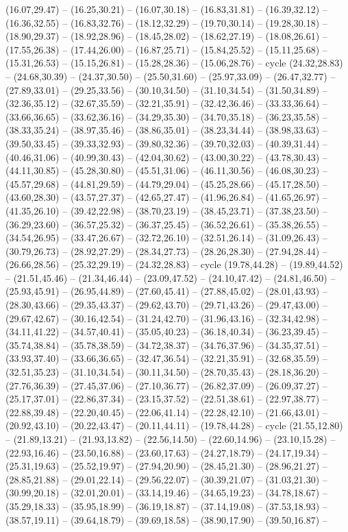 {(16.07,29.47) -- (16.25,30.21) -- (16.07,30.18) -- (16.83,31.81) -- (16.39,32.12) -- (16.36,32.55) -- (16.83,32.76) -- (18.12,32.29) -- (19.70,30.14) -- (19.28,30.18) -- (18.90,29.37) -- (18.92,28.96) -- (18.45,28.02) -- (18.62,27.19) -- (18.08,26.61) -- (17.55,26.38) -- (17.44,26.00) -- (16.87,25.71) -- (15.84,25.52) -- (15.11,25.68) -- (15.31,26.53) -- (15.15,26.81) -- (15.28,28.36) -- (15.06,28.76) -- cycle (24.32,28.83) -- (24.68,30.39) -- (24.37,30.50) -- (25.50,31.60) -- (25.97,33.09) -- (26.47,32.77) -- (27.89,33.01) -- (29.25,33.56) -- (30.10,34.50) -- (31.10,34.54) -- (31.50,34.89) -- (32.36,35.12) -- (32.67,35.59) -- (32.21,35.91) -- (32.42,36.46) -- (33.33,36.64) -- (33.66,36.65) -- (33.62,36.16) -- (34.29,35.30) -- (34.70,35.18) -- (36.23,35.58) -- (38.33,35.24) -- (38.97,35.46) -- (38.86,35.01) -- (38.23,34.44) -- (38.98,33.63) -- (39.50,33.45) -- (39.33,32.93) -- (39.80,32.36) -- (39.70,32.03) -- (40.39,31.44) -- (40.46,31.06) -- (40.99,30.43) -- (42.04,30.62) -- (43.00,30.22) -- (43.78,30.43) -- (44.11,30.85) -- (45.28,30.80) -- (45.51,31.06) -- (46.11,30.56) -- (46.08,30.23) -- (45.57,29.68) -- (44.81,29.59) -- (44.79,29.04) -- (45.25,28.66) -- (45.17,28.50) -- (43.60,28.30) -- (43.57,27.37) -- (42.65,27.47) -- (41.96,26.84) -- (41.65,26.97) -- (41.35,26.10) -- (39.42,22.98) -- (38.70,23.19) -- (38.45,23.71) -- (37.38,23.50) -- (36.29,23.60) -- (36.57,25.32) -- (36.37,25.45) -- (36.52,26.61) -- (35.38,26.55) -- (34.54,26.95) -- (33.47,26.67) -- (32.72,26.10) -- (32.51,26.14) -- (31.09,26.43) -- (30.79,26.73) -- (28.92,27.29) -- (28.34,27.73) -- (28.26,28.30) -- (27.94,28.44) -- (26.66,28.56) -- (25.32,29.19) -- (24.32,28.83) -- cycle (19.78,44.28) -- (19.89,44.52) -- (21.51,45.46) -- (21.34,46.44) -- (23.09,47.52) -- (24.10,47.42) -- (24.81,46.50) -- (25.93,45.91) -- (26.95,44.89) -- (27.60,45.41) -- (27.88,45.02) -- (28.01,43.93) -- (28.30,43.66) -- (29.35,43.37) -- (29.62,43.70) -- (29.71,43.26) -- (29.47,43.00) -- (29.67,42.67) -- (30.16,42.54) -- (31.24,42.70) -- (31.96,43.16) -- (32.34,42.98) -- (34.11,41.22) -- (34.57,40.41) -- (35.05,40.23) -- (36.18,40.34) -- (36.23,39.45) -- (35.74,38.84) -- (35.78,38.59) -- (34.72,38.37) -- (34.76,37.96) -- (34.35,37.51) -- (33.93,37.40) -- (33.66,36.65) -- (32.47,36.54) -- (32.21,35.91) -- (32.68,35.59) -- (32.51,35.23) -- (31.10,34.54) -- (30.11,34.50) -- (28.70,35.43) -- (28.18,36.20) -- (27.76,36.39) -- (27.45,37.06) -- (27.10,36.77) -- (26.82,37.09) -- (26.09,37.27) -- (25.17,37.01) -- (22.86,37.34) -- (23.15,37.52) -- (22.51,38.61) -- (22.97,38.77) -- (22.88,39.48) -- (22.20,40.45) -- (22.06,41.14) -- (22.28,42.10) -- (21.66,43.01) -- (20.92,43.10) -- (20.22,43.47) -- (20.11,44.11) -- (19.78,44.28) -- cycle (21.55,12.80) -- (21.89,13.21) -- (21.93,13.82) -- (22.56,14.50) -- (22.60,14.96) -- (23.10,15.28) -- (22.93,16.46) -- (23.50,16.88) -- (23.60,17.63) -- (24.27,18.79) -- (24.17,19.34) -- (25.31,19.63) -- (25.52,19.97) -- (27.94,20.90) -- (28.45,21.30) -- (28.96,21.27) -- (28.85,21.88) -- (29.01,22.14) -- (29.56,22.07) -- (30.39,21.07) -- (31.03,21.30) -- (30.99,20.18) -- (32.01,20.01) -- (33.14,19.46) -- (34.65,19.23) -- (34.78,18.67) -- (35.29,18.33) -- (35.95,18.99) -- (36.19,18.87) -- (37.14,19.08) -- (37.53,18.93) -- (38.57,19.11) -- (39.64,18.79) -- (39.69,18.58) -- (38.90,17.90) -- (39.50,16.87) -- }
